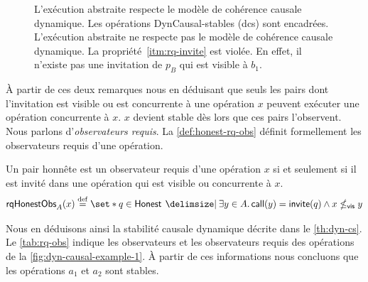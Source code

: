 \begin{figure}[hbt]
\begin{subfigure}{\linewidth}
    \caption{}\label{fig:dyn-causal-example-2}
\end{subfigure}
\caption[Stabilité causale dynamique]{L'exécution abstraite  respecte le modèle de cohérence causale dynamique.
Les opérations DynCausal-stables (dcs) sont encadrées.
L'exécution abstraite  ne respecte pas le modèle de cohérence causale dynamique.
La propriété~\ref{itm:rq-invite} est violée.
En effet, il n'existe pas une invitation de $p_B$ qui est visible à $b_1$.}\label{fig:dyn-causal-example}
\end{figure}

À partir de ces deux remarques nous en déduisant que seuls les pairs dont l'invitation est visible ou est concurrente à une opération $x$ peuvent exécuter une opération concurrente à $x$.
$x$ devient stable dès lors que ces pairs l'observent.
Nous parlons d'\emph{observateurs requis}.
La \autoref{def:honest-rq-obs} définit formellement les observateurs requis d'une opération.

\begin{definition}\label{def:honest-rq-obs}
Un pair honnête est un observateur requis d'une opération $x$ si et seulement si il est invité dans une opération qui est visible ou concurrente à $x$.
\begin{equation*}
    \trm{rqHonestObs}_A(x) \defeq \set*{q \in \trm{Honest} \given \exists y \in A \qsep \trm{call}(y) = \trm{invite}(q) \land x \nviseq y}
\end{equation*}
\end{definition}

Nous en déduisons ainsi la stabilité causale dynamique décrite dans le \autoref{th:dyn-cs}.
Le \autoref{tab:rq-obs} indique les observateurs et les observateurs requis des opérations de la \autoref{fig:dyn-causal-example-1}.
À partir de ces informations nous concluons que les opérations $a_1$ et $a_2$ sont stables.

